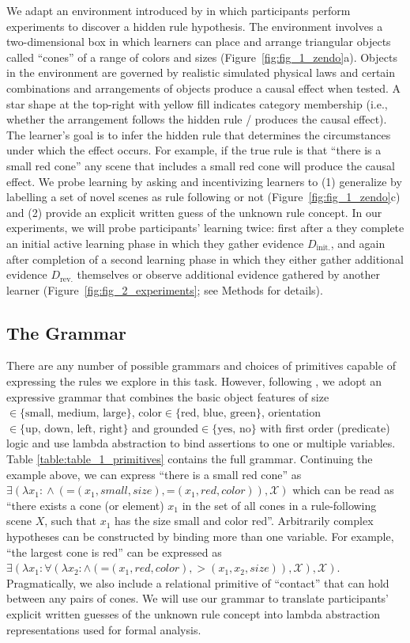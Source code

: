 \documentclass[doc,natbib,floatsintext]{apa7}
\newcommand{\xx}{\mathcal{X}} %
\newcommand{\dr}{D_{\mathrm{rev.}}}%
\newcommand{\di}{D_{\mathrm{init.}}}%
\begin{document}
We adapt an environment introduced by \cite{bramley2018grounding} in which participants perform experiments to  discover a hidden rule hypothesis. The environment involves a two-dimensional box in which learners can place and arrange triangular objects called ``cones'' of a range of colors and sizes (Figure~\ref{fig:fig_1_zendo}a). Objects in the environment are governed by realistic simulated physical laws and certain combinations and arrangements of objects produce a causal effect when tested. A star shape at the top-right with yellow fill indicates category membership (i.e., whether the arrangement follows the hidden rule / produces the causal effect). The learner's goal is to infer the hidden rule that determines the circumstances under which the effect occurs. For example, if the true rule is that ``there is a small red cone'' any scene that includes a small red cone will produce the causal effect. We probe learning by asking and incentivizing learners to (1) generalize by labelling a set of novel scenes as rule following or not (Figure~\ref{fig:fig_1_zendo}c) and (2) provide an explicit written guess of the unknown rule concept. In our experiments, we will probe participants' learning twice: first after a they complete an initial active learning phase in which they gather evidence $\di$, and again after completion of a second learning phase in which they either gather additional evidence $\dr$ themselves or observe additional evidence gathered by another learner (Figure~\ref{fig:fig_2_experiments}; see Methods for details).

\subsection{The Grammar}
There are any number of possible grammars and choices of primitives capable of expressing the rules we explore in this task. However, following \cite{piantadosi2016logical}, we adopt an expressive grammar that combines the basic object features of size \(\in\{\text{small, medium, large}\}\), color\(\in\{\text{red, blue, green}\}\), orientation\(\in\{\text{up, down, left, right}\}\) and grounded\(\in\{\text{yes, no}\}\) with first order (predicate) logic and use lambda abstraction \citep{church1932set} to bind assertions to one or multiple variables. Table \ref{table:table_1_primitives} contains the full grammar. Continuing the example above, we can express ``there is a small red cone'' as $\exists(\lambda x_{1}\!:\! \land(\text{=}(x_1, small, size), \text{=}(x_1, red, color)),\xx)$ which can be read as ``there exists a cone (or element) $x_1$ in the set of all cones in a rule-following scene $X$, such that $x_1$ has the size small and color red''. Arbitrarily complex hypotheses can be constructed by binding more than one variable. For example, ``the largest cone is red'' can be expressed as $\exists(\lambda\!x_1\!:\forall(\lambda\!x_2\!:\land(\text{=} (x_1, red, color), > (x_1,  x_2, size)), \xx), \xx)$. Pragmatically, we also include a relational primitive of ``contact'' that can hold between any pairs of cones. We will use our grammar to translate participants' explicit written guesses of the unknown rule concept into lambda abstraction representations used for formal analysis. 
\end{document}
